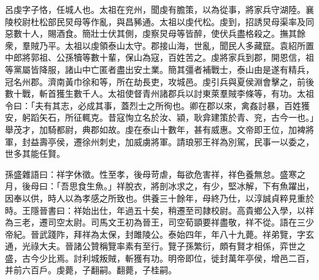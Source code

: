 
\begin{pinyinscope}
呂虔字子恪，任城人也。太祖在兖州，聞虔有膽策，以為從事，將家兵守湖陸。襄陵校尉杜松部民炅母等作亂，與昌豨通。太祖以虔代松。虔到，招誘炅母渠率及同惡數十人，賜酒食。簡壯士伏其側，虔察炅母等皆醉，使伏兵盡格殺之。撫其餘衆，羣賊乃平。太祖以虔領泰山太守。郡接山海，世亂，聞民人多藏竄。袁紹所置中郎將郭祖、公孫犢等數十輩，保山為寇，百姓苦之。虔將家兵到郡，開恩信，祖等黨屬皆降服，諸山中亡匿者盡出安土業。簡其彊者補戰士，泰山由是遂有精兵，冠名州郡。濟南黃巾徐和等，所在劫長吏，攻城邑。虔引兵與夏侯淵會擊之，前後數十戰，斬首獲生數千人。太祖使督青州諸郡兵以討東萊羣賊李條等，有功。太祖令曰：「夫有其志，必成其事，蓋烈士之所徇也。卿在郡以來，禽姦討暴，百姓獲安，躬蹈矢石，所征輒克。昔寇恂立名於汝、潁，耿弇建策於青、兖，古今一也。」舉茂才，加騎都尉，典郡如故。虔在泰山十數年，甚有威惠。文帝即王位，加裨將軍，封益壽亭侯，遷徐州刺史，加威虜將軍。請琅邪王祥為別駕，民事一以委之，世多其能任賢。

孫盛雜語曰：祥字休徵。性至孝，後母苛虐，每欲危害祥，祥色養無怠。盛寒之月，後母曰：「吾思食生魚。」祥脫衣，將剖冰求之，有少，堅冰解，下有魚躍出，因奉以供，時人以為孝感之所致也。供養三十餘年，母終乃仕，以淳誠貞粹見重於時。王隱晉書曰：祥始出仕，年過五十矣，稍遷至司隷校尉。高貴鄉公入學，以祥為三老，遷司空太尉。司馬文王初為晉王，司空荀顗要祥盡敬，祥不從。語在三少帝紀。晉武踐阼，拜祥為太保，封雎陵公。泰始四年，年八十九薨。祥弟覽，字玄通，光祿大夫。晉諸公贊稱覽率素有至行。覽子孫繁衍，頗有賢才相係，弈世之盛，古今少比焉。討利城叛賊，斬獲有功。明帝即位，徙封萬年亭侯，增邑二百，并前六百戶。虔薨，子翻嗣。翻薨，子桂嗣。


\end{pinyinscope}